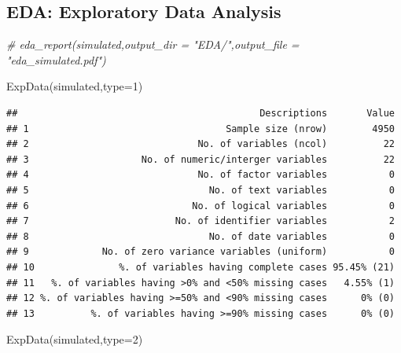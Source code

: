\documentclass[
]{article}
\newenvironment{Shaded}{\begin{snugshade}}{\end{snugshade}}
\newcommand{\AttributeTok}[1]{\textcolor[rgb]{0.77,0.63,0.00}{#1}}
\newcommand{\CommentTok}[1]{\textcolor[rgb]{0.56,0.35,0.01}{\textit{#1}}}
\newcommand{\DecValTok}[1]{\textcolor[rgb]{0.00,0.00,0.81}{#1}}
\newcommand{\FunctionTok}[1]{\textcolor[rgb]{0.00,0.00,0.00}{#1}}
\newcommand{\NormalTok}[1]{#1}
\begin{document}
\hypertarget{eda-exploratory-data-analysis}{%
\subsection{EDA: Exploratory Data
Analysis}\label{eda-exploratory-data-analysis}}

\begin{Shaded}
\begin{Highlighting}[]
\CommentTok{\# eda\_report(simulated,output\_dir = "EDA/",output\_file = "eda\_simulated.pdf")}

  \FunctionTok{ExpData}\NormalTok{(simulated,}\AttributeTok{type=}\DecValTok{1}\NormalTok{)}
\end{Highlighting}
\end{Shaded}

\begin{verbatim}
##                                           Descriptions       Value
## 1                                   Sample size (nrow)        4950
## 2                              No. of variables (ncol)          22
## 3                    No. of numeric/interger variables          22
## 4                              No. of factor variables           0
## 5                                No. of text variables           0
## 6                             No. of logical variables           0
## 7                          No. of identifier variables           2
## 8                                No. of date variables           0
## 9             No. of zero variance variables (uniform)           0
## 10               %. of variables having complete cases 95.45% (21)
## 11   %. of variables having >0% and <50% missing cases   4.55% (1)
## 12 %. of variables having >=50% and <90% missing cases      0% (0)
## 13          %. of variables having >=90% missing cases      0% (0)
\end{verbatim}

\begin{Shaded}
\begin{Highlighting}[]
  \FunctionTok{ExpData}\NormalTok{(simulated,}\AttributeTok{type=}\DecValTok{2}\NormalTok{)}
\end{Highlighting}
\end{Shaded}
\end{document}
